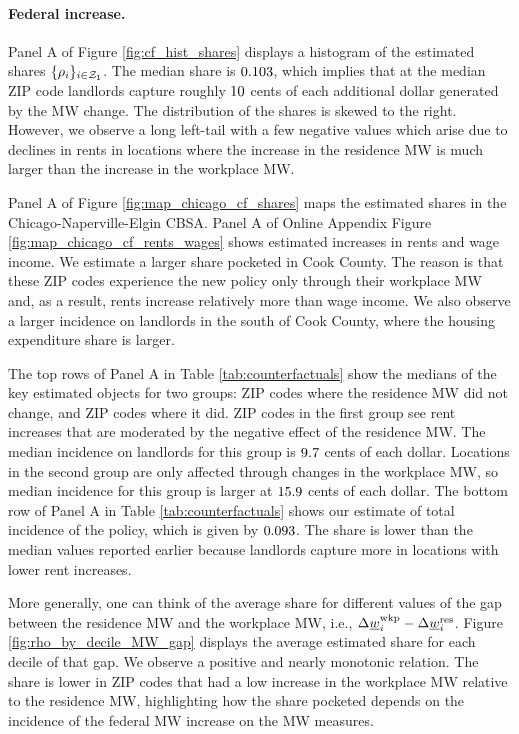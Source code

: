 \paragraph{Federal increase.}

Panel A of Figure \ref{fig:cf_hist_shares} displays a histogram of the
estimated shares $\{\rho_i\}_{i\in\mathcal{Z}_1}$.
The median share is $\textnormal{0.103}$, which implies that at the median 
ZIP code landlords capture roughly $\textnormal{10}$ cents of each 
additional dollar generated by the MW change.
The distribution of the shares is skewed to the right.
However, we observe a long left-tail with a few negative values which arise due 
to declines in rents in locations where the increase in the residence MW is much 
larger than the increase in the workplace MW.

Panel A of Figure \ref{fig:map_chicago_cf_shares} maps the estimated shares 
in the Chicago-Naperville-Elgin CBSA.
Panel A of Online Appendix Figure \ref{fig:map_chicago_cf_rents_wages} shows
estimated increases in rents and wage income.
We estimate a larger share pocketed in Cook County.
The reason is that these ZIP codes experience the new policy only through
their workplace MW and, as a result, rents increase relatively more than
wage income.
We also observe a larger incidence on landlords in the south of Cook County,
where the housing expenditure share is larger.

The top rows of Panel A in Table \ref{tab:counterfactuals} show the medians of 
the key estimated objects for two groups:
ZIP codes where the residence MW did not change, and 
ZIP codes where it did.
ZIP codes in the first group see rent increases that are moderated by the 
negative effect of the residence MW.
The median incidence on landlords for this group is $\textnormal{9.7}$ 
cents of each dollar.
Locations in the second group are only affected through changes in the 
workplace MW, so median incidence for this group is larger at 
$\textnormal{15.9}$ cents of each dollar.
The bottom row of Panel A in Table \ref{tab:counterfactuals} shows our estimate
of total incidence of the policy, which is given by $\textnormal{0.093}$.
The share is lower than the median values reported earlier because landlords 
capture more in locations with lower rent increases.

More generally, one can think of the average share for different values of the 
gap between the residence MW and the workplace MW, i.e., 
$\Delta \underline{w}_i^{\text{wkp}} - \Delta \underline{w}_i^{\text{res}}$.
Figure \ref{fig:rho_by_decile_MW_gap} displays the average estimated share for 
each decile of that gap.
We observe a positive and nearly monotonic relation.
The share is lower in ZIP codes that had a low increase in the workplace MW 
relative to the residence MW, highlighting how the share pocketed depends on
the incidence of the federal MW increase on the MW measures.

